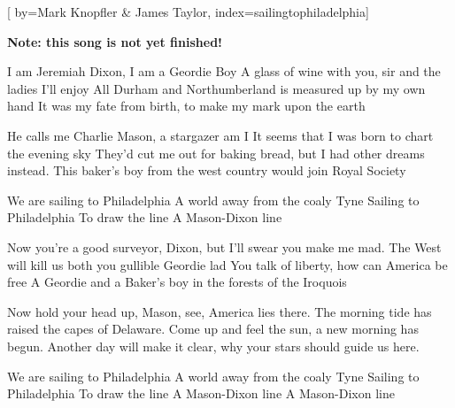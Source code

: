 

[%
    by={Mark Knopfler \& James Taylor},
    index={sailingtophiladelphia}]


    \label{sailingtophiladelphia}

    \textbf{Note: this song is not yet finished!}

    \beginverse*
    \endverse

    \beginverse\memorize
        I am Jeremiah Dixon, I am a Geordie Boy
        A glass of wine with you, sir and the ladies I'll enjoy
        All Durham and Northumberland is measured up by my own hand
        It was my fate from birth, to make my mark upon the earth
    \endverse

    \beginverse
        He calls me Charlie Mason, a stargazer am I
        It seems that I was born to chart the evening sky
        They'd cut me out for baking bread, but I had other dreams instead.
        This baker's boy from the west country would join Royal Society
    \endverse

    \beginchorus
        We are sailing to Philadelphia
        A world away from the coaly Tyne
        Sailing to Philadelphia
        To draw the line
        A Mason-Dixon line
    \endchorus

    \beginverse*
    \endverse

    \beginverse
        Now you're a good surveyor, Dixon, but I'll swear you make me mad.
        The West will kill us both you gullible Geordie lad
        You talk of liberty, how can America be free
        A Geordie and a Baker's boy in the forests of the Iroquois
    \endverse

    \beginverse
        Now hold your head up, Mason, see, America lies there.
        The morning tide has raised the capes of Delaware.
        Come up and feel the sun, a new morning has begun.
        Another day will make it clear, why your stars should guide us here.
    \endverse

    \beginchorus
        We are sailing to Philadelphia
        A world away from the coaly Tyne
        Sailing to Philadelphia
        To draw the line
        A Mason-Dixon line
        A Mason-Dixon line
    \endchorus

    \beginverse*
    \endverse
\endsong
